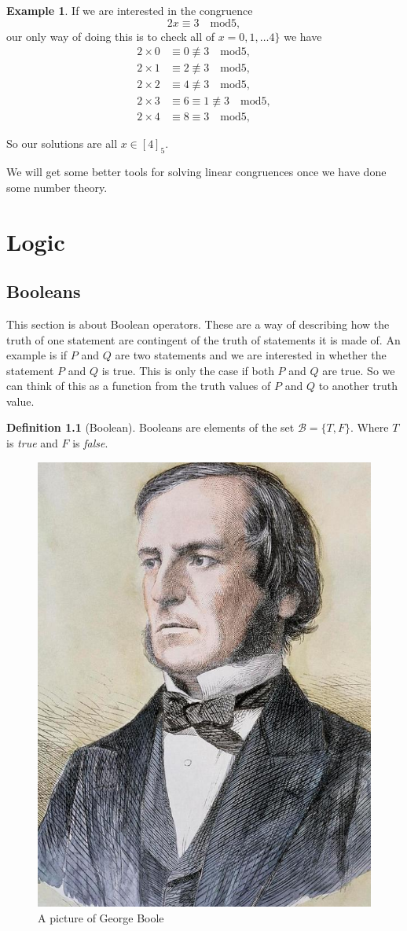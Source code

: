 \documentclass[
]{book}
\theoremstyle{definition}
\newtheorem{definition}{Definition}[chapter]
\theoremstyle{definition}
\newtheorem{example}{Example}[chapter]
\theoremstyle{definition}
\theoremstyle{definition}
\theoremstyle{remark}
\begin{document}
\begin{example}
If we are interested in the congruence
\[ 2x \equiv 3 \quad \mbox{mod} 5,  \] our only way of doing this is to check all of \(x= 0,1, \dots 4\}\) we have
\begin{align*}
2\times 0 &\equiv 0 \not\equiv 3 \quad \mbox{mod} 5,\\
2 \times 1 &\equiv 2 \not\equiv 3 \quad \mbox{mod} 5,\\
2 \times 2 & \equiv 4 \not\equiv 3 \quad \mbox{mod} 5,\\
2 \times 3 &\equiv 6 \equiv 1 \not\equiv 3 \quad \mbox{mod} 5,\\
2 \times 4 &\equiv 8 \equiv 3 \quad \mbox{mod} 5,
\end{align*}

So our solutions are all \(x \in [4]_5\).
\end{example}

We will get some better tools for solving linear congruences once we have done some number theory.

\chapter{Logic}\label{logic}

\section{Booleans}\label{booleans}

This section is about Boolean operators. These are a way of describing how the truth of one statement are contingent of the truth of statements it is made of. An example is if \(P\) and \(Q\) are two statements and we are interested in whether the statement \(P\) and \(Q\) is true. This is only the case if both \(P\) and \(Q\) are true. So we can think of this as a function from the truth values of \(P\) and \(Q\) to another truth value.

\begin{definition}[Boolean]
Booleans are elements of the set \(\mathcal{B}=\{T,F\}\). Where \(T\) is \emph{true} and \(F\) is \emph{false}.
\end{definition}

\begin{figure}
\includegraphics[width=0.3\linewidth]{George_Boole_color} \caption{A picture of George Boole}\label{fig:unnamed-chunk-26}
\end{figure}
\end{document}
